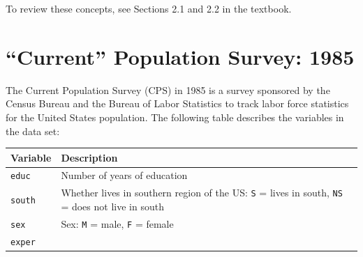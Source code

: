 \documentclass[
]{report}
\begin{document}
To review these concepts, see Sections 2.1 and 2.2 in the textbook.

\newpage

\hypertarget{current-population-survey-1985}{%
\section{``Current'' Population Survey: 1985}\label{current-population-survey-1985}}

The Current Population Survey (CPS) in 1985 is a survey sponsored by the Census Bureau and the Bureau of Labor Statistics to track labor force statistics for the United States population. The following table describes the variables in the data set:

\begin{longtable}[]{@{}ll@{}}
\toprule
\begin{minipage}[b]{0.11\columnwidth}\raggedright
\textbf{Variable}\strut
\end{minipage} & \begin{minipage}[b]{0.83\columnwidth}\raggedright
\textbf{Description}\strut
\end{minipage}\tabularnewline
\midrule
\endhead
\begin{minipage}[t]{0.11\columnwidth}\raggedright
\texttt{educ}\strut
\end{minipage} & \begin{minipage}[t]{0.83\columnwidth}\raggedright
Number of years of education\strut
\end{minipage}\tabularnewline
\begin{minipage}[t]{0.11\columnwidth}\raggedright
\texttt{south}\strut
\end{minipage} & \begin{minipage}[t]{0.83\columnwidth}\raggedright
Whether lives in southern region of the US: \texttt{S} = lives in south, \texttt{NS} = does not live in south\strut
\end{minipage}\tabularnewline
\begin{minipage}[t]{0.11\columnwidth}\raggedright
\texttt{sex}\strut
\end{minipage} & \begin{minipage}[t]{0.83\columnwidth}\raggedright
Sex: \texttt{M} = male, \texttt{F} = female\strut
\end{minipage}\tabularnewline
\begin{minipage}[t]{0.11\columnwidth}\raggedright
\texttt{exper}\strut
\end{minipage} & \begin{minipage}[t]{0.83\columnwidth}\raggedright

\end{minipage}
\end{longtable}
\end{document}
